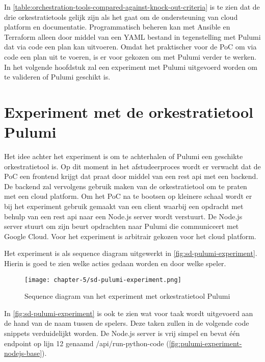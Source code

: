 In \autoref{table:orchestration-tools-compared-against-knock-out-criteria} is te zien dat de drie orkestratietools gelijk zijn als het gaat om de ondersteuning van cloud platform en documentatie. Programmatisch beheren kan met Ansible en Terraform alleen door middel van een YAML bestand in tegenstelling met Pulumi dat via code een plan kan uitvoeren. Omdat het praktischer voor de PoC om via code een plan uit te voeren, is er voor gekozen om met Pulumi verder te werken. In het volgende hoofdstuk zal een experiment met Pulumi uitgevoerd worden om te valideren of Pulumi geschikt is.

\section{Experiment met de orkestratietool Pulumi}\label{subsec:ch5-experiment-met-de-orkestratietool-pulumi}
Het idee achter het experiment is om te achterhalen of Pulumi een geschikte orkestratietool is. Op dit moment in het afstudeerproces wordt er verwacht dat de PoC een frontend krijgt dat praat door middel van een \acrfull{rest} \Acrshort{api} met een backend. De backend zal vervolgens gebruik maken van de orkestratietool om te praten met een cloud platform. Om het PoC na te bootsen op kleinere schaal wordt er bij het experiment gebruik gemaakt van een client waarbij een opdracht met behulp van een \Acrshort{rest} \Acrshort{api} naar een Node.js server wordt verstuurt. De Node.js server stuurt om zijn beurt opdrachten naar Pulumi die communiceert met Google Cloud. Voor het experiment is arbitrair gekozen voor het cloud platform.

\newpage

Het experiment is als sequence diagram uitgewerkt in \autoref{fig:sd-pulumi-experiment}. Hierin is goed te zien welke acties gedaan worden en door welke speler.

\begin{figure}[hbt!]
  \centering
  \texttt{[image: chapter-5/sd-pulumi-experiment.png]}
  \caption{Sequence diagram van het experiment met orkestratietool Pulumi}
  \label{fig:sd-pulumi-experiment}
\end{figure}

\newpage

In \autoref{fig:sd-pulumi-experiment} is ook te zien wat voor taak wordt uitgevoerd aan de hand van de naam tussen de spelers. Deze taken zullen in de volgende code snippets verduidelijkt worden. De Node.js server is vrij simpel en bevat één endpoint op lijn 12 genaamd /api/run-python-code (\autoref{fig:pulumi-experiment-nodejs-base}). 

